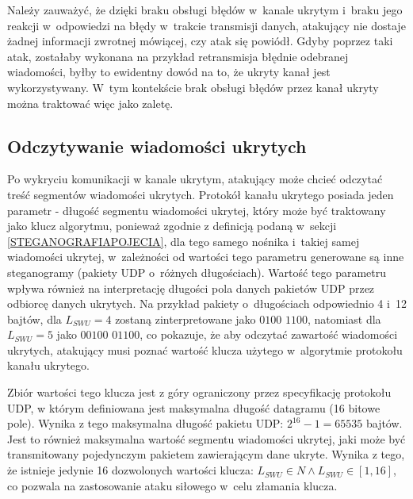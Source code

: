 \documentclass[a4paper, twoside, 12pt]{report}
\begin{document}
       Należy zauważyć, że dzięki braku obsługi błędów w~kanale ukrytym
       i~braku jego reakcji w~odpowiedzi na błędy w~trakcie transmisji danych, atakujący
       nie dostaje żadnej informacji zwrotnej mówiącej, czy atak się powiódł. Gdyby
       poprzez taki atak, zostałaby wykonana na przykład retransmisja błędnie odebranej
       wiadomości, byłby to ewidentny dowód na to, że ukryty kanał jest wykorzystywany.
       W~tym kontekście brak obsługi błędów przez kanał ukryty można traktować więc
       jako zaletę.

       \subsection{Odczytywanie wiadomości ukrytych}
       Po wykryciu komunikacji w kanale ukrytym, atakujący może chcieć
       odczytać treść segmentów wiadomości ukrytych. Protokół kanału ukrytego posiada
       jeden parametr - długość segmentu wiadomości ukrytej, który
       może być traktowany jako klucz algorytmu, ponieważ zgodnie z definicją podaną
       w~sekcji \ref{STEGANOGRAFIAPOJECIA}, dla tego samego nośnika i~takiej samej
       wiadomości ukrytej, w~zależności od wartości tego parametru generowane są
       inne steganogramy (pakiety UDP o~różnych długościach). Wartość tego parametru wpływa również
       na interpretację długości pola danych pakietów UDP przez odbiorcę danych ukrytych.
       Na przykład pakiety o~długościach odpowiednio 4 i~12 bajtów, dla \( L_{SWU} = 4 \)
       zostaną zinterpretowane jako \( 0100 \) \( 1100 \), natomiast dla \( L_{SWU} = 5 \)
       jako \( 00100 \) \( 01100 \), co pokazuje, że aby odczytać zawartość wiadomości
       ukrytych, atakujący musi poznać wartość klucza użytego w~algorytmie protokołu
       kanału ukrytego.

       Zbiór wartości tego
       klucza jest z góry ograniczony przez specyfikację protokołu UDP, w którym
       definiowana jest maksymalna długość datagramu (16 bitowe pole).
       Wynika z tego maksymalna długość pakietu UDP: \(2^{16} - 1 = 65535\) bajtów. Jest to również maksymalna
       wartość segmentu wiadomości ukrytej, jaki może być transmitowany pojedynczym
       pakietem zawierającym dane ukryte. Wynika z tego, że istnieje jedynie 16
       dozwolonych wartości klucza: \( L_{SWU} \in N \land L_{SWU} \in [1, 16] \),
       co pozwala na zastosowanie ataku siłowego w~celu złamania klucza.
\end{document}
